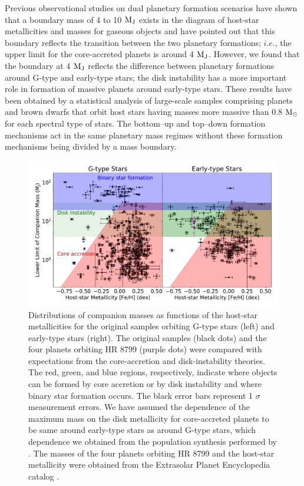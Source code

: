 \documentclass[twocolumn]{aastex62}
\begin{document}
\begin{CJK*}{UTF8}{min}
Previous observational studies on dual planetary formation scenarios \citep{2007A&A...464..779R, 2017A&A...603A..30S, 2018ApJ...853...37S} have shown that a boundary mass of 4 to 10 $\rm M_J$ exists in the diagram of host-star metallicities and masses for gaseous objects and have pointed out that this boundary reflects the transition between the two planetary formations; $i.e.$, the upper limit for the core-accreted planets is around 4 $\rm M_J$. However, we found that the boundary at 4 $\rm M_J$ reflects the difference between planetary formations around G-type and early-type stars; the disk instability has a more important role in formation of massive planets around early-type stars. These results have been obtained by a statistical analysis of large-scale samples comprising planets and brown dwarfs that orbit host stars having masses more massive than 0.8 $\rm M_{\odot}$ for each spectral type of stars. The bottom--up and top--down formation mechanisms act in the same planetary mass regimes without these formation mechanisms being divided by a mass boundary.

\begin{figure}[t]
\begin{center}
\includegraphics[width=17cm]{formation.pdf}
\caption{Distributions of companion masses as functions of the host-star metallicities for the original samples orbiting G-type stars (left) and early-type stars (right). The original samples (black dots) and the four planets orbiting HR 8799 (purple dots) were compared with expectations from the core-accretion and disk-instability theories. The red, green, and blue regions, respectively, indicate where objects can be formed by core accretion or by disk instability and where binary star formation occurs. The black error bars represent 1 $\sigma$ measurement errors. We have assumed the dependence of the maximum mass on the disk metallicity for core-accreted planets to be same around early-type stars as around G-type stars, which dependence we obtained from the population synthesis performed by \cite{2012A&A...541A..97M}. The masses of the four planets orbiting HR 8799 and the host-star metallicity were obtained from the Extrasolar Planet Encyclopedia catalog \citep{2011A&A...532A..79S}.}
\label{fig:metal_Mp}
\end{center}
\end{figure}


\end{CJK*}
\end{document}
